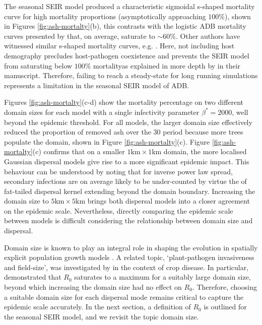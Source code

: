 The seasonal SEIR model produced a characteristic sigmoidal s-shaped mortality curve for high mortality proportions 
(asymptotically approaching $100\%$), shown in Figures \ref{fig:ash-mortalty}(b), this contrasts with the logistic ADB mortality 
curves presented by \cite{https://doi.org/10.1002/ppp3.11} that, on average, saturate to $\sim 60 \%$.
Other authors have witnessed similar s-shaped mortality curves, e.g. \cite{lohmus2014ash}.
Here, not including host demography precludes host-pathogen coexistence and prevents the SEIR model from saturating below
$100\%$ mortality\textemdash as explained in more depth by \cite{time-varying-infectivity} in their manuscript.
Therefore, failing to reach a steady-state for long running simulations represents a limitation in the seasonal SEIR model of ADB.

Figures \ref{fig:ash-mortalty}(c-d) show the mortality percentage on two different domain sizes for each model with a single infectivity parameter $\beta^*=2000$, well beyond the epidemic threshold.
For all models, the larger domain size effectively reduced the proportion of removed ash over the $30$ period because more trees populate the domain, shown in Figure \ref{fig:ash-mortalty}(c).
Figure \ref{fig:ash-mortalty}(c) confirms that on a smaller $1\mathrm{km}\times 1\mathrm{km}$ domain, the more localised Gaussian dispersal models give rise to a more significant epidemic impact.
This behaviour can be understood by noting that for inverse power law spread, secondary infections are on average likely to be under-counted
by virtue the of fat-tailed dispersal kernel extending beyond the domain boundary.
Increasing the domain size to $5\mathrm{km}\times 5\mathrm{km}$ brings both dispersal models into a closer agreement on the epidemic scale.
Nevertheless, directly comparing the epidemic scale between models is difficult considering the relationship between domain size and dispersal.

Domain size is known to play an integral role in shaping the evolution in spatially explicit population growth models \cite{tang2011asymptotic}.
A related topic, `plant-pathogen invasiveness and field-size', was investigated by \cite{mikaberidze2016invasiveness} in the context of crop disease.
In particular, \cite{mikaberidze2016invasiveness} demonstrated that $R_0$ saturates to a maximum for a suitably large domain size, beyond which increasing the domain size had no effect on $R_0$.
Therefore, choosing a suitable domain size for each dispersal mode remains critical to capture the epidemic scale accurately.
In the next section, a definition of $R_0$ is outlined for the seasonal SEIR model, and we revisit the topic domain size.

